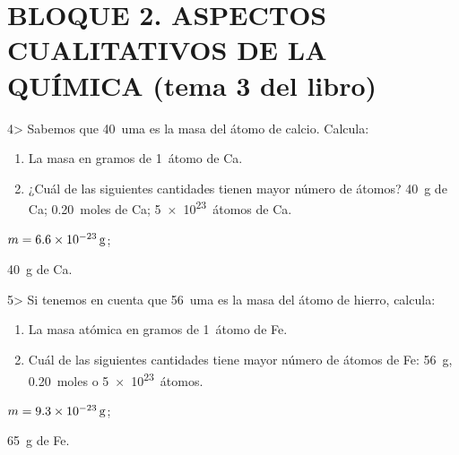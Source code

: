 \documentclass{article}
\begin{document}
\section{BLOQUE 2. ASPECTOS CUALITATIVOS DE LA QUÍMICA (tema 3 del libro)}

\begin{exercise}
4> Sabemos que \SI{40}{uma} es la masa del átomo de calcio. Calcula:
  \begin{enumerate}[label=\alph*)]
    \item La masa en gramos de \SI{1}{átomo} de Ca.
    \item ¿Cuál de las siguientes cantidades tienen mayor número de átomos? \SI{40}{g} de Ca; \SI{0,20}{moles} de Ca; \SI{5e23}{átomos} de Ca.
  \end{enumerate}
\end{exercise}

\begin{solution}[print]
  \begin{enumerate*}[label=\alph*)]
    \item $m = \SI{6,6E-23}{\gram}$;
    \item \SI{40}{\gram} de Ca.
  \end{enumerate*}
\end{solution}

\begin{exercise}
  5> Si tenemos en cuenta que \SI{56}{uma} es la masa del átomo de hierro, calcula:
  \begin{enumerate}
    \item La masa atómica en gramos de \SI{1}{átomo} de Fe.
    \item Cuál de las siguientes cantidades tiene mayor número de átomos de Fe: \SI{56}{\gram}, \SI{0,20}{moles} o \SI{5e23}{átomos}.
  \end{enumerate}
\end{exercise}

\begin{solution}[print]
  \begin{enumerate*}[label=\alph*)]
    \item $m = \SI{9,3E-23}{\gram}$;
    \item \SI{65}{\gram} de Fe.
  \end{enumerate*}
\end{solution}
\end{document}
